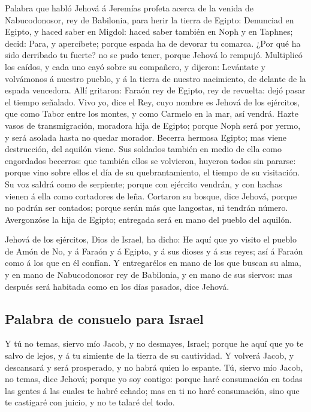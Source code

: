  Palabra que habló Jehová á Jeremías profeta acerca de la
venida de Nabucodonosor, rey de Babilonia, para herir la tierra de
Egipto:  Denunciad en Egipto, y haced saber en Migdol:
haced saber también en Noph y en Taphnes; decid: Para, y apercíbete;
porque espada ha de devorar tu comarca.  ¿Por qué ha sido
derribado tu fuerte? no se pudo tener, porque Jehová lo rempujó.
 Multiplicó los caídos, y cada uno cayó sobre su compañero,
y dijeron: Levántate y volvámonos á nuestro pueblo, y á la tierra de
nuestro nacimiento, de delante de la espada vencedora. 
Allí gritaron: Faraón rey de Egipto, rey de revuelta: dejó pasar el
tiempo señalado.  Vivo yo, dice el Rey, cuyo nombre es
Jehová de los ejércitos, que como Tabor entre los montes, y como Carmelo
en la mar, así vendrá.  Hazte vasos de transmigración,
moradora hija de Egipto; porque Noph será por yermo, y será asolada
hasta no quedar morador.  Becerra hermosa Egipto; mas viene
destrucción, del aquilón viene.  Sus soldados también en
medio de ella como engordados becerros: que también ellos se volvieron,
huyeron todos sin pararse: porque vino sobre ellos el día de su
quebrantamiento, el tiempo de su visitación.  Su voz saldrá
como de serpiente; porque con ejército vendrán, y con hachas vienen á
ella como cortadores de leña.  Cortaron su bosque, dice
Jehová, porque no podrán ser contados; porque serán más que langostas,
ni tendrán número.  Avergonzóse la hija de Egipto;
entregada será en mano del pueblo del aquilón.

 Jehová de los ejércitos, Dios de Israel, ha dicho: He aquí
que yo visito el pueblo de Amón de No, y á Faraón y á Egipto, y á sus
dioses y á sus reyes; así á Faraón como á los que en él confían.
 Y entregarélos en mano de los que buscan su alma, y en
mano de Nabucodonosor rey de Babilonia, y en mano de sus siervos: mas
después será habitada como en los días pasados, dice Jehová.

\hypertarget{palabra-de-consuelo-para-israel}{%
\subsection{Palabra de consuelo para
Israel}\label{palabra-de-consuelo-para-israel}}

 Y tú no temas, siervo mío Jacob, y no desmayes, Israel;
porque he aquí que yo te salvo de lejos, y á tu simiente de la tierra de
su cautividad. Y volverá Jacob, y descansará y será prosperado, y no
habrá quien lo espante.  Tú, siervo mío Jacob, no temas,
dice Jehová; porque yo soy contigo: porque haré consumación en todas las
gentes á las cuales te habré echado; mas en ti no haré consumación, sino
que te castigaré con juicio, y no te talaré del todo.

